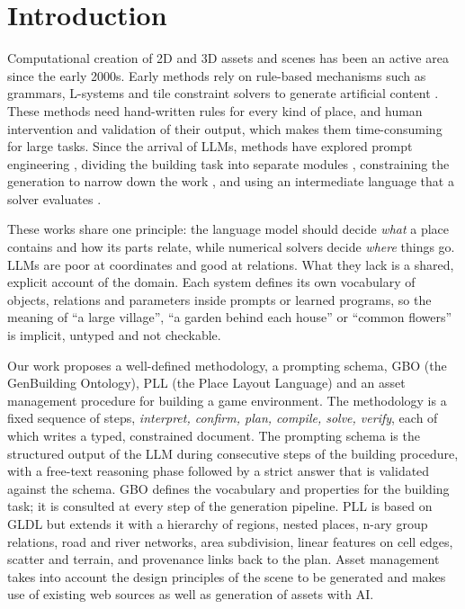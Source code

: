 \documentclass[conference]{IEEEtran}
\begin{document}
\section{Introduction}
Computational creation of 2D and 3D assets and scenes has been an active area since the
early 2000s. Early methods rely on rule-based mechanisms such as grammars, L-systems and
tile constraint solvers to generate artificial content \cite{parish2001,shaker2016pcg}.
These methods need hand-written rules for every kind of place, and human intervention
and validation of their output, which makes them time-consuming for large tasks. Since
the arrival of LLMs, methods have explored prompt engineering \cite{todd2023,sudhakaran2023},
dividing the building task into separate modules \cite{holodeck}, constraining the
generation to narrow down the work \cite{scenecraft}, and using an intermediate
language that a solver evaluates \cite{gldl}.

These works share one principle: the language model should decide \emph{what} a place
contains and how its parts relate, while numerical solvers decide \emph{where} things
go. LLMs are poor at coordinates and good at relations. What they lack is a shared,
explicit account of the domain. Each system defines its own vocabulary of objects,
relations and parameters inside prompts or learned programs, so the meaning of
``a large village'', ``a garden behind each house'' or ``common flowers'' is implicit,
untyped and not checkable.

Our work proposes a well-defined methodology, a prompting schema, GBO (the GenBuilding
Ontology), PLL (the Place Layout Language) and an asset management procedure for
building a game environment. The methodology is a fixed sequence of steps,
\emph{interpret, confirm, plan, compile, solve, verify}, each of which writes a typed,
constrained document. The prompting schema is the structured output of the LLM during
consecutive steps of the building procedure, with a free-text reasoning phase followed by
a strict answer that is validated against the schema. GBO defines the vocabulary and
properties for the building task; it is consulted at every step of the generation
pipeline. PLL is based on GLDL \cite{gldl} but extends it with a hierarchy of regions,
nested places, n-ary group relations, road and river networks, area subdivision, linear
features on cell edges, scatter and terrain, and provenance links back to the plan.
Asset management takes into account the design principles of the scene to be generated
and makes use of existing web sources as well as generation of assets with AI.
\end{document}
